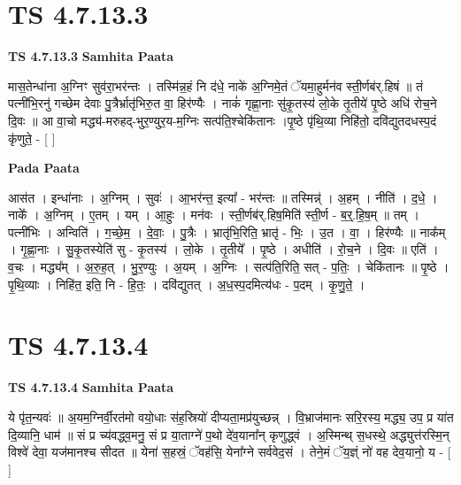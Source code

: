 \documentclass[17pt]{extarticle}
\begin{document}
\section*{ TS 4.7.13.3 }

\textbf{TS 4.7.13.3 } \newline
\textbf{Samhita Paata} \newline

मास॒तेन्धा॑ना अ॒ग्निꣳ सुव॑रा॒भर॑न्तः । तस्मि॑न्न॒हं नि द॑धे॒ नाके॑ अ॒ग्निमे॒तं ॅयमा॒हुर्मन॑व स्ती॒र्णब॑र्.हिषं ॥ तं पत्नी॑भि॒रनु॑ गच्छेम देवाः पु॒त्रैर्भ्रातृ॑भिरु॒त वा॒ हिर॑ण्यैः । नाकं॑ गृह्णा॒नाः सु॑कृ॒तस्य॑ लो॒के तृ॒तीये॑ पृ॒ष्ठे अधि॑ रोच॒ने दि॒वः ॥ आ वा॒चो मद्ध्य॑-मरुहद्-भुर॒ण्युर॒य-म॒ग्निः सत्प॑ति॒श्चेकि॑तानः ।पृ॒ष्ठे पृ॑थि॒व्या निहि॑तो॒ दवि॑द्युतदधस्प॒दं कृ॑णुते॒ - [  ] \newline

\textbf{Pada Paata} \newline

आस॑त । इन्धा॑नाः । अ॒ग्निम् । सुवः॑ । आ॒भर॑न्त॒ इत्या᳚ - भर॑न्तः ॥ तस्मिन्न्॑ । अ॒हम् । नीति॑ । द॒धे॒ । नाके᳚ । अ॒ग्निम् । ए॒तम् । यम् । आ॒हुः । मन॑वः । स्ती॒र्णब॑र्.हिष॒मिति॑ स्ती॒र्ण - ब॒र्॒.हि॒ष॒म् ॥ तम् । पत्नी॑भिः । अन्विति॑ । ग॒च्छे॒म॒ । दे॒वाः॒ । पु॒त्रैः । भ्रातृ॑भि॒रिति॒ भ्रातृ॑ - भिः॒ । उ॒त । वा॒ । हिर॑ण्यैः ॥ नाक᳚म् । गृ॒ह्णा॒नाः । सु॒कृ॒तस्येति॑ सु - कृ॒तस्य॑ । लो॒के । तृ॒तीये᳚ । पृ॒ष्ठे । अधीति॑ । रो॒च॒ने । दि॒वः ॥ एति॑ । व॒चः । मद्ध्य᳚म् । अ॒रु॒ह॒त् । भु॒र॒ण्युः । अ॒यम् । अ॒ग्निः । सत्प॑ति॒रिति॒ सत् - प॒तिः॒ । चेकि॑तानः ॥ पृ॒ष्ठे । पृ॒थि॒व्याः । निहि॑त॒ इति॒ नि - हि॒तः॒ । दवि॑द्युतत् । अ॒ध॒स्प॒दमित्य॑धः - प॒दम् । कृ॒णु॒ते॒ ।  \newline




\section*{ TS 4.7.13.4 }

\textbf{TS 4.7.13.4 } \newline
\textbf{Samhita Paata} \newline

ये पृ॑त॒न्यवः॑ ॥ अ॒यम॒ग्निर्वी॒रत॑मो वयो॒धाः स॑ह॒स्रियो॑ दीप्यता॒मप्र॑युच्छन्न् । वि॒भ्राज॑मानः सरि॒रस्य॒ मद्ध्य॒ उप॒ प्र या॑त दि॒व्यानि॒ धाम॑ ॥ सं प्र च्य॑वद्ध्व॒मनु॒ सं प्र या॒ताग्ने॑ प॒थो दे॑व॒याना᳚न् कृणुद्ध्वं । अ॒स्मिन्थ् स॒धस्थे॒ अद्ध्युत्त॑रस्मि॒न् विश्वे॑ देवा॒ यज॑मानश्च सीदत ॥ येना॑ स॒हस्रं॒ ॅवह॑सि॒ येना᳚ग्ने सर्ववेद॒सं । तेने॒मं ॅय॒ज्ञ्ं नो॑ वह देव॒यानो॒ य - [  ] \newline
\end{document}
